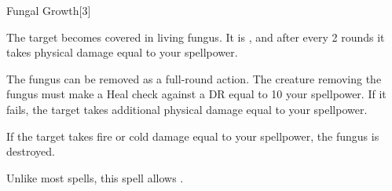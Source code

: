 \begin{spellsection}{Fungal Growth}[3]
    \begin{spellheader}
    \end{spellheader}
    \begin{spellcontent}
        \begin{spelltargetinginfo}
        \end{spelltargetinginfo}
        \begin{spelleffects}
            \spelleffect The target becomes covered in living fungus. It is \sickened, and after every 2 rounds it takes physical damage equal to your spellpower.

            The fungus can be removed as a full-round action. The creature removing the fungus must make a Heal check against a DR equal to 10 \add your spellpower. If it fails, the target takes additional physical damage equal to your spellpower.

            If the target takes fire or cold damage equal to your spellpower, the fungus is destroyed.
        \end{spelleffects}
    \end{spellcontent}
    \begin{spellfooter}
        \spellnotes Unlike most  spells, this spell allows .
        \miscastexplode
    \end{spellfooter}
    \begin{spellaugments}
    \end{spellaugments}
\end{spellsection}


